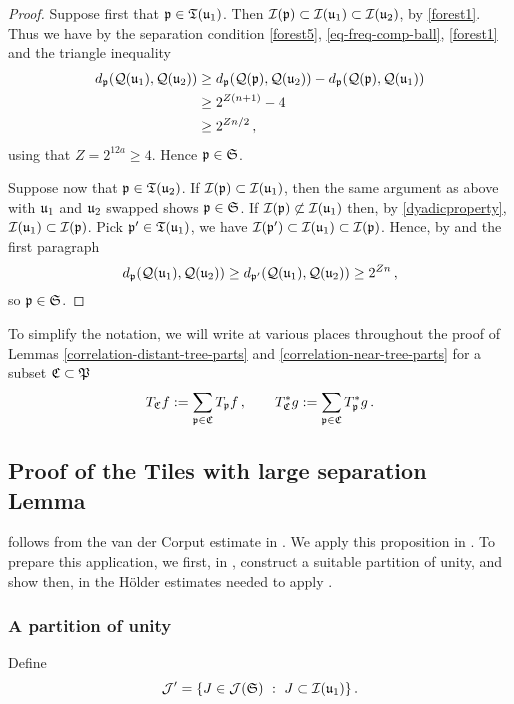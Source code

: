 \begin{proof}
    \leanok
    Suppose first that ${\mathfrak p} \in {\mathfrak T}({\mathfrak u}_1)$. Then ${\mathcal{I}}({\mathfrak p}) \subset {\mathcal{I}}({\mathfrak u}_1) \subset {\mathcal{I}}({\mathfrak u}_2)$, by \eqref{forest1}. Thus we have by the separation condition \eqref{forest5}, \eqref{eq-freq-comp-ball}, \eqref{forest1} and the triangle inequality
    \begin{align*}
        d_{{\mathfrak p}}({\mathcal{Q}}({\mathfrak u}_1), {\mathcal{Q}}({\mathfrak u}_2)) &\ge d_{{\mathfrak p}}({\mathcal{Q}}({\mathfrak p}), {\mathcal{Q}}({\mathfrak u}_2)) - d_{{\mathfrak p}}({\mathcal{Q}}({\mathfrak p}), {\mathcal{Q}}({\mathfrak u}_1))\\
        &\ge 2^{Z(n+1)} - 4\\
        &\ge 2^{Zn/2}\,,
    \end{align*}
    using that $Z= 2^{12a}\ge 4$. Hence ${\mathfrak p} \in \mathfrak{S}$.

    Suppose now that ${\mathfrak p} \in {\mathfrak T}({\mathfrak u}_2)$. If ${\mathcal{I}}({\mathfrak p}) \subset {\mathcal{I}}({\mathfrak u}_1)$, then the same argument as above with ${\mathfrak u}_1$ and ${\mathfrak u}_2$ swapped shows ${\mathfrak p} \in \mathfrak{S}$. If ${\mathcal{I}}({\mathfrak p}) \not \subset {\mathcal{I}}({\mathfrak u}_1)$ then, by \eqref{dyadicproperty}, ${\mathcal{I}}({\mathfrak u}_1) \subset {\mathcal{I}}({\mathfrak p})$. Pick ${\mathfrak p}' \in {\mathfrak T}({\mathfrak u}_1)$, we have ${\mathcal{I}}({\mathfrak p}') \subset {\mathcal{I}}({\mathfrak u}_1) \subset {\mathcal{I}}({\mathfrak p})$. Hence, by  and the first paragraph
    $$
        d_{{\mathfrak p}}({\mathcal{Q}}({\mathfrak u}_1), {\mathcal{Q}}({\mathfrak u}_2)) \ge d_{{\mathfrak p}'}({\mathcal{Q}}({\mathfrak u}_1), {\mathcal{Q}}({\mathfrak u}_2)) \ge 2^{Zn}\,,
    $$
    so ${\mathfrak p} \in \mathfrak{S}$.
\end{proof}

To simplify the notation, we will write at various places throughout the proof of Lemmas \ref{correlation-distant-tree-parts} and \ref{correlation-near-tree-parts} for a subset ${\mathfrak C} \subset {\mathfrak P}$
$$
    T_{{\mathfrak C}} f := \sum_{{\mathfrak p} \in {\mathfrak C}} T_{{\mathfrak p}} f\,, \quad\quad T_{{\mathfrak C}}^* g := \sum_{{\mathfrak p}\in{\mathfrak C}} T_{{\mathfrak p}}^* g\,.
$$

\subsection{Proof of the Tiles with large separation Lemma}
    \label{subsec-big-tiles}

 follows from the van der Corput estimate in . We apply this proposition in . To prepare this application, we first, in , construct a suitable partition of unity, and show then, in  the H\"older estimates needed to apply .

\subsubsection{A partition of unity}
\label{subsubsec-pao}
    Define
    $$
        \mathcal{J}' = \{J \in \mathcal{J}(\mathfrak{S}) \ : \ J \subset {\mathcal{I}}({\mathfrak u}_1)\}\,.
    $$

